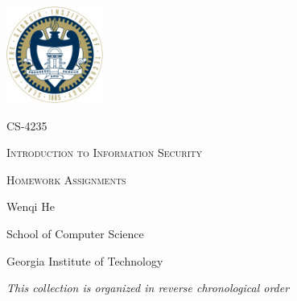 \documentclass[10pt]{article}
\begin{document}
\begin{titlepage}
	\centering
	\includegraphics[width=120px]{logo.png}\par
	\vspace{3cm}
	{\scshape\Large CS-4235\par}
	{\Huge\scshape Introduction to Information Security \par}
	\vspace{0.3cm}
	{\scshape\LARGE Homework Assignments \par}
	\vspace{2cm}
	\vfill
	{\Large Wenqi He\par}
	\vspace{0.3cm}
	{\Large School of Computer Science\par}	
	\vspace{0.3cm}
	{\Large Georgia Institute of Technology \par}
	\vfill
	{\large\itshape This collection is organized in reverse chronological order}
\end{titlepage}
\end{document}
